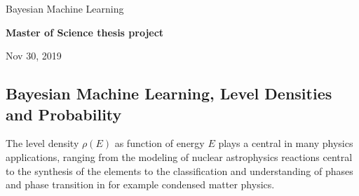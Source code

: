 \documentclass[%
oneside,                 %
final,                   %
10pt]{article}
\begin{document}

\newcommand{\exercisesection}[1]{\subsection*{#1}}






\thispagestyle{empty}

\begin{center}
{\LARGE\bf
\begin{spacing}{1.25}
Bayesian Machine Learning
\end{spacing}
}
\end{center}


\begin{center}
{\bf Master of Science thesis project${}^{}$} \\ [0mm]
\end{center}

\begin{center}
\end{center}
    

\begin{center}
Nov 30, 2019
\end{center}

\vspace{1cm}


\subsection*{Bayesian Machine Learning, Level Densities and Probability}

The level density $\rho(E)$ as function of energy $E$ plays a central in many
physics applications, ranging from the modeling of nuclear
astrophysics reactions central to the synthesis of the elements to the
classification and understanding of phases and phase transition in for example condensed matter
physics.
\end{document}
